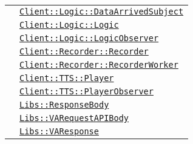\begin{longtable}{|>{\centering}m{3cm}|m{10cm}<{\centering}|}
& \hyperref[Client::Logic::DataArrivedSubject]{\texttt{Client::Logic::DataArrivedSubject}}\\
& \hyperref[Client::Logic::Logic]{\texttt{Client::Logic::Logic}}\\
& \hyperref[Client::Logic::LogicObserver]{\texttt{Client::Logic::LogicObserver}}\\
& \hyperref[Client::Recorder::Recorder]{\texttt{Client::Recorder::Recorder}}\\
& \hyperref[Client::Recorder::RecorderWorker]{\texttt{Client::Recorder::RecorderWorker}}\\
& \hyperref[Client::TTS::Player]{\texttt{Client::TTS::Player}}\\
& \hyperref[Client::TTS::PlayerObserver]{\texttt{Client::TTS::PlayerObserver}}\\
& \hyperref[Libs::ResponseBody]{\texttt{Libs::ResponseBody}}\\
& \hyperref[Libs::VARequestAPIBody]{\texttt{Libs::VARequestAPIBody}}\\
& \hyperref[Libs::VAResponse]{\texttt{Libs::VAResponse}}\\ \hline


\end{longtable}
